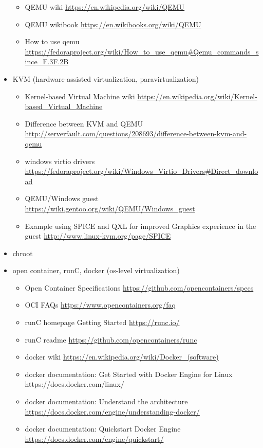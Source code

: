\documentclass{article}
\begin{document}
\begin{itemize}
\begin{itemize}
            \item QEMU wiki \url{https://en.wikipedia.org/wiki/QEMU}
            \item QEMU wikibook \url{https://en.wikibooks.org/wiki/QEMU}
            \item How to use qemu \url{https://fedoraproject.org/wiki/How_to_use_qemu#Qemu_commands_since_F.3F.2B}
        \end{itemize}
    \item KVM (hardware-assisted virtualization, paravirtualization)
        \begin{itemize}
            \item Kernel-based Virtual Machine wiki \url{https://en.wikipedia.org/wiki/Kernel-based_Virtual_Machine}
            \item Difference between KVM and QEMU \url{http://serverfault.com/questions/208693/difference-between-kvm-and-qemu}
            \item windows virtio drivers \url{https://fedoraproject.org/wiki/Windows_Virtio_Drivers#Direct_download}
            \item QEMU/Windows guest \url{https://wiki.gentoo.org/wiki/QEMU/Windows_guest}
            \item Example using SPICE and QXL for improved Graphics experience in the guest \url{http://www.linux-kvm.org/page/SPICE}
        \end{itemize}
    \item chroot
    \item open container, runC, docker (os-level virtualization)
        \begin{itemize}
            \item Open Container Specifications \url{https://github.com/opencontainers/specs}
            \item OCI FAQs \url{https://www.opencontainers.org/faq}
            \item runC homepage Getting Started \url{https://runc.io/}
            \item runC readme \url{https://github.com/opencontainers/runc}
            \item docker wiki \url{https://en.wikipedia.org/wiki/Docker_(software)}
            \item docker documentation: Get Started with Docker Engine for Linux https://docs.docker.com/linux/
            \item docker documentation: Understand the architecture \url{https://docs.docker.com/engine/understanding-docker/}
            \item docker documentation: Quickstart Docker Engine \url{https://docs.docker.com/engine/quickstart/}
        \end{itemize}
\end{itemize}
%
\end{document}
